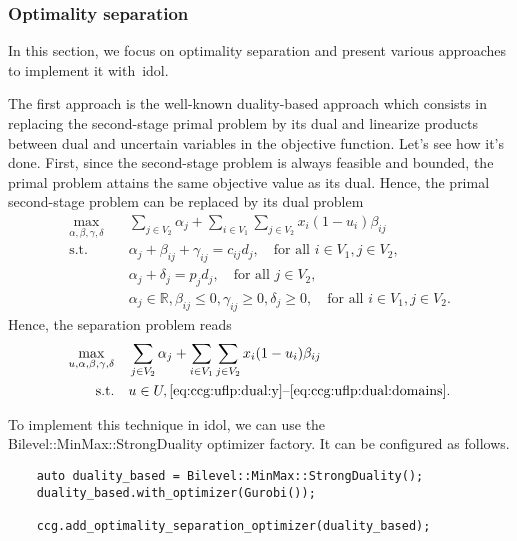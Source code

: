 \subsubsection{Optimality separation}

In this section, we focus on optimality separation and present various
approaches to implement it with~\textsf{idol}. 


The first approach is the well-known duality-based approach which consists in
replacing the second-stage primal problem by its dual and linearize products
between dual and uncertain variables in the objective function. Let's see how
it's done. First, since the second-stage problem is always feasible and
bounded, the primal problem attains the same objective value as its dual.
Hence, the primal second-stage problem can be replaced by its dual problem
% 
\begin{subequations}
    \begin{align}
        \max_{\alpha,\beta,\gamma,\delta} \quad & \sum_{ j\in V_2 } \alpha_j + \sum_{i\in V_1} \sum_{j\in V_2} x_i(1 - u_i) \beta_{ij} \\
        \text{s.t.} \quad & \alpha_j + \beta_{ij} + \gamma_{ij} = c_{ij}d_j, \quad \text{for all }i\in V_1, j\in V_2,
        \label{eq:ccg:uflp:dual:y} \\
        & \alpha_j + \delta_j = p_jd_j, \quad\text{for all } j\in V_2, \\
        & \alpha_j\in\mathbb{R}, \beta_{ij} \le 0, \gamma_{ij} \ge 0, \delta_j \ge 0, \quad \text{for all } i\in V_1, j\in V_2.
        \label{eq:ccg:uflp:dual:domains}
    \end{align}
\end{subequations}
Hence, the separation problem reads 
\begin{align*}
    \max_{u,\alpha,\beta,\gamma,\delta} \quad & \sum_{ j\in V_2 } \alpha_j + \sum_{i\in V_1} \sum_{j\in V_2} x_i(1 - u_i)\beta_{ij} \\
    \text{s.t.} \quad & u\in U, \text{\eqref{eq:ccg:uflp:dual:y}--\eqref{eq:ccg:uflp:dual:domains}}.
\end{align*}

To implement this technique in \textsf{idol}, we can use the
\textsf{Bilevel::MinMax::StrongDuality} optimizer factory. It can be
configured as follows.
%
\begin{lstlisting}
    auto duality_based = Bilevel::MinMax::StrongDuality();
    duality_based.with_optimizer(Gurobi());

    ccg.add_optimality_separation_optimizer(duality_based);
\end{lstlisting}


